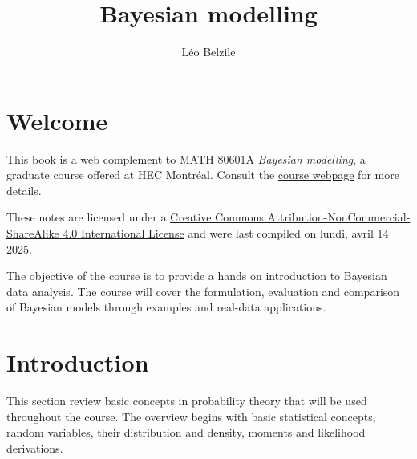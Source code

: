 \documentclass[
  11pt,
  letterpaper,
]{scrbook}
\title{Bayesian modelling}
\author{Léo Belzile}
\date{}
\renewcommand*\contentsname{Table of contents}
\newcommand\contentsname{Table of contents}
\theoremstyle{plain}
\theoremstyle{plain}
\theoremstyle{plain}
\theoremstyle{definition}
\theoremstyle{definition}
\theoremstyle{definition}
\theoremstyle{remark}
\begin{document}
\frontmatter
\maketitle

\renewcommand*\contentsname{Table of contents}
{
\setcounter{tocdepth}{2}
\tableofcontents
}

\mainmatter
{}

\chapter*{Welcome}\label{welcome}


This book is a web complement to MATH 80601A \emph{Bayesian modelling},
a graduate course offered at HEC Montréal. Consult the
\href{https://lbelzile.github.io/bayesmod}{course webpage} for more
details.

These notes are licensed under a
\href{http://creativecommons.org/licenses/by-nc-sa/4.0/}{Creative
Commons Attribution-NonCommercial-ShareAlike 4.0 International License}
and were last compiled on lundi, avril 14 2025.

The objective of the course is to provide a hands on introduction to
Bayesian data analysis. The course will cover the formulation,
evaluation and comparison of Bayesian models through examples and
real-data applications.


\chapter{Introduction}\label{introduction}

This section review basic concepts in probability theory that will be
used throughout the course. The overview begins with basic statistical
concepts, random variables, their distribution and density, moments and
likelihood derivations.
\end{document}
